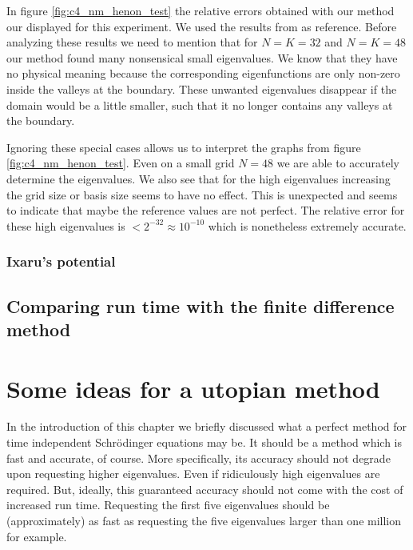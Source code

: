In figure \ref{fig:c4_nm_henon_test} the relative errors obtained with our method our displayed for this experiment. We used the results from \cite{wang_new_2009} as reference. Before analyzing these results we need to mention that for $N = K = 32$ and $N = K = 48$ our method found many nonsensical small eigenvalues. We know that they have no physical meaning because the corresponding eigenfunctions are only non-zero inside the valleys at the boundary. These unwanted eigenvalues disappear if the domain would be a little smaller, such that it no longer contains any valleys at the boundary.

Ignoring these special cases allows us to interpret the graphs from figure \ref{fig:c4_nm_henon_test}. Even on a small grid $N = 48$ we are able to accurately determine the eigenvalues. We also see that for the high eigenvalues increasing the grid size or basis size seems to have no effect. This is unexpected and seems to indicate that maybe the reference values are not perfect. The relative error for these high eigenvalues is $< 2^{-32} \approx 10^{-10}$ which is nonetheless extremely accurate.

\subsubsection{Ixaru's potential}\label{sec:c4_numerical_ixaru}



\subsection{Comparing run time with the finite difference method}\label{sec:c4_nm_vs_fd}

\section{Some ideas for a utopian method}\label{c4:sec_utopy}

In the introduction of this chapter we briefly discussed what a perfect method for time independent Schrödinger equations may be. It should be a method which is fast and accurate, of course. More specifically, its accuracy should not degrade upon requesting higher eigenvalues. Even if ridiculously high eigenvalues are required. But, ideally, this guaranteed accuracy should not come with the cost of increased run time. Requesting the first five eigenvalues should be (approximately) as fast as requesting the five eigenvalues larger than one million for example.

